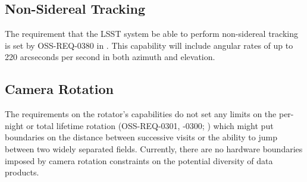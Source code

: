 \subsection{Non-Sidereal Tracking}
The requirement that the LSST system be able to perform non-sidereal tracking is set by OSS-REQ-0380 in .
This capability will include angular rates of up to 220 arcseconds per second in both azimuth and elevation. 

\subsection{Camera Rotation}
The requirements on the rotator's capabilities do not set any limits on the per-night or total lifetime rotation (OSS-REQ-0301, -0300; ) which might put boundaries on the distance between successive visits or the ability to jump between two widely separated fields.
Currently, there are no hardware boundaries imposed by camera rotation constraints on the potential diversity of data products.
